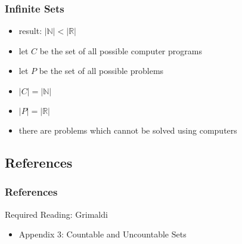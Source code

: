 \documentclass[dvipsnames]{beamer}
\begin{document}
\begin{frame}
  \frametitle{Infinite Sets}

  \begin{itemize}
    \item result: $|\mathbb{N}| < |\mathbb{R}|$

    \pause
    \medskip
    \item let $C$ be the set of all possible computer programs
    \item let $P$ be the set of all possible problems
    \item $|C| = |\mathbb{N}|$
    \item $|P| = |\mathbb{R}|$

    \pause
    \medskip
    \item there are problems which cannot be solved using computers
  \end{itemize}
\end{frame}

\subsection*{References}

\begin{frame}
  \frametitle{References}

  \begin{block}{Required Reading: Grimaldi}
    \begin{itemize}
      \item Appendix 3: \alert{Countable and Uncountable Sets}
    \end{itemize}
  \end{block}
\end{frame}
\end{document}
